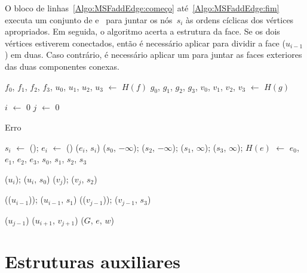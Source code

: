 O bloco de linhas~\ref{Algo:MSFaddEdge:começo} até~\ref{Algo:MSFaddEdge:fim} executa um conjunto de \LCOCycle{} e~\LCOMerge{} para juntar os nós~$s_i$ às ordens cíclicas dos vértices apropriados.  
Em seguida, o algoritmo acerta a estrutura da face.
Se os dois vértices estiverem conectados, então é necessário aplicar \LCOSplit{} para dividir a face \LCOFindNode($u_{i-1}$) em duas.
Caso contrário, é necessário aplicar um \LCOMerge para juntar as faces exteriores das duas componentes conexas.

\begin{algorithm}[htb]
\caption{\MSFaddEdge($G$, $e$, $u$, $f$, $v$, $g$, $w$)}
\label{Algo:MSFaddEdge}
\begin{algorithmic}[1]

\State $f_0$, $f_1$, $f_2$, $f_3$, $u_0$, $u_1$, $u_2$, $u_3$ $\gets$ $H(f)$
\State $g_0$, $g_1$, $g_2$, $g_3$, $v_0$, $v_1$, $v_2$, $v_3$ $\gets$ $H(g)$

 $i$ $\gets$ $0$
\EndIf
{} $j$ $\gets$ $0$
\EndIf

\label{Algo:MSFaddEdge:linhaSe}
\State \Return Erro
\EndIf

\State $s_i$ $\gets$ \LCOMakeNode(); $e_i$ $\gets$ \LCOMakeNode()
\State \linkcutAddEdge($e_i$, $s_i$)
\EndFor
\State \LCOAddCost($s_0$, $-\infty$); \LCOAddCost($s_2$, $-\infty$);
\State \LCOAddCost($s_1$, $\infty$); \LCOAddCost($s_3$, $\infty$);
\State $H(e)$ $\gets$ $e_0$, $e_1$, $e_2$, $e_3$, $s_0$, $s_1$, $s_2$, $s_3$

\State \LCOCycle($u_i$); \LCOMerge($u_i$, $s_0$)\label{Algo:MSFaddEdge:começo}
\State \LCOCycle($v_j$); \LCOMerge($v_j$, $s_2$)


\State \LCOCycle(\treapPredecessor($u_{i-1}$)); \LCOMerge($u_{i-1}$, $s_1$)
\State \LCOCycle(\treapPredecessor($v_{j-1}$)); \LCOMerge($v_{j-1}$, $s_3$)\label{Algo:MSFaddEdge:fim}


\State \LCOSplit($u_{j-1}$)
\Else
\State \LCOMerge($u_{i+1}$, $v_{j+1}$)
\EndIf
\State \MSFupdate($G$, $e$, $w$)
\end{algorithmic}
\end{algorithm}

\section{Estruturas auxiliares}

